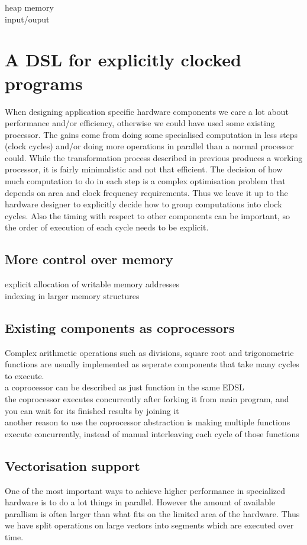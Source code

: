 \documentclass[preprint]{sigplanconf}
\begin{document}
heap memory \\
input/ouput 

\section{A DSL for explicitly clocked programs}
When designing application specific hardware components we care a lot about performance and/or efficiency, otherwise we could have used some existing processor.
The gains come from doing some specialised computation in less steps (clock cycles) and/or doing more operations in parallel than a normal processor could.
While the transformation process described in previous produces a working processor, it is fairly minimalistic and not that efficient.
The decision of how much computation to do in each step is a complex optimisation problem that depends on area and clock frequency requirements.
Thus we leave it up to the hardware designer to explicitly decide how to group computations into clock cycles.
Also the timing with respect to other components can be important, so the order of execution of each cycle needs to be explicit.

\subsection{More control over memory}
explicit allocation of writable memory addresses\\
indexing in larger memory structures

\subsection{Existing components as coprocessors}
Complex arithmetic operations such as divisions, square root and trigonometric functions are usually implemented as seperate components that take many cycles to execute. \\
a coprocessor can be described as just function in the same EDSL \\
the coprocessor executes concurrently after forking it from main program, and you can wait for its finished results by joining it \\
another reason to use the coprocessor abstraction is making multiple functions execute concurrently, instead of manual interleaving each cycle of those functions

\subsection{Vectorisation support}
One of the most important ways to achieve higher performance in specialized hardware is to do a lot things in parallel.
However the amount of available parallism is often larger than what fits on the limited area of the hardware.
Thus we have split operations on large vectors into segments which are executed over time. \\
\end{document}
